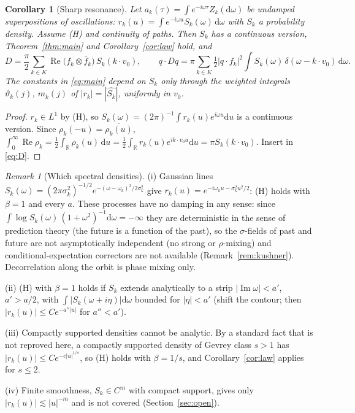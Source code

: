 \documentclass[11pt]{article}
\newcommand{\dd}{\mathrm{d}}
\renewcommand{\Re}{\operatorname{Re}}
\renewcommand{\Im}{\operatorname{Im}}
\newtheorem{corollary}[theorem]{Corollary}
\theoremstyle{remark}
\newtheorem{remark}[theorem]{Remark}
\begin{document}
\begin{corollary}[Sharp resonance]\label{cor:sharp}
Let $a_k(\tau) = \int e^{-i\omega\tau}Z_k(\dd\omega)$ be undamped
superpositions of oscillations: $r_k(u) = \int e^{-i\omega u}S_k(\omega)\,\dd\omega$
with $S_k$ a probability density. Assume \textup{(H)} and continuity of
paths. Then $S_k$ has a continuous version, Theorem~\ref{thm:main} and
Corollary~\ref{cor:law} hold, and
\begin{equation}
  D = \frac\pi2\sum_{k\in K}\Re\bigl(f_k\otimes\bar f_k\bigr)\,S_k(k\cdot v_0),
  \qquad
  q\cdot Dq = \pi\sum_{k\in K}\tfrac12|q\cdot f_k|^2
     \int S_k(\omega)\,\delta(\omega-k\cdot v_0)\,\dd\omega .
  \label{eq:Dsharp}
\end{equation}
The constants in \eqref{eq:main} depend on $S_k$ only through the weighted
integrals $\vartheta_k(j)$, $m_k(j)$ of $|r_k| = |\widehat{S_k}|$, uniformly
in $v_0$.
\end{corollary}

\begin{proof}
$r_k\in L^1$ by (H), so $S_k(\omega) = (2\pi)^{-1}\int r_k(u)e^{i\omega u}\dd u$
is a continuous version. Since $\rho_k(-u) = \overline{\rho_k(u)}$,
$\int_0^\infty\Re\rho_k = \frac12\int_{\mathbb{R}}\rho_k(u)\,\dd u
= \frac12\int_{\mathbb{R}}r_k(u)e^{ik\cdot v_0u}\dd u = \pi S_k(k\cdot v_0)$.
Insert in \eqref{eq:D}.
\end{proof}

\begin{remark}[Which spectral densities]\label{rem:spec}
(i) Gaussian lines $S_k(\omega) = (2\pi\sigma_k^2)^{-1/2}
e^{-(\omega-\omega_k)^2/2\sigma_k^2}$ give
$r_k(u) = e^{-i\omega_ku-\sigma_k^2u^2/2}$: (H) holds with $\beta=1$ and
every $a$. These processes have no damping in any sense: since
$\int\log S_k(\omega)\,(1+\omega^2)^{-1}\dd\omega = -\infty$ they are
deterministic in the sense of prediction theory (the future is a function of
the past), so the $\sigma$-fields of past and future are not asymptotically
independent (no strong or $\rho$-mixing) and conditional-expectation
correctors are not available (Remark~\ref{rem:kushner}). Decorrelation along the orbit
is phase mixing only.

(ii) (H) with $\beta=1$ holds if $S_k$ extends analytically to a strip
$|\Im\omega|<a'$, $a'>a/2$, with $\int|S_k(\omega+i\eta)|\dd\omega$ bounded
for $|\eta|<a'$ (shift the contour; then $|r_k(u)|\le Ce^{-a''|u|}$ for
$a''<a'$).

(iii) Compactly supported densities cannot be analytic. By a standard fact
that is not reproved here, a compactly supported density of Gevrey class
$s>1$ has $|r_k(u)|\le Ce^{-c|u|^{1/s}}$, so (H) holds with $\beta = 1/s$,
and Corollary~\ref{cor:law} applies for $s\le2$.

(iv) Finite smoothness, $S_k\in C^m$ with compact support, gives only
$|r_k(u)|\lesssim|u|^{-m}$ and is not covered (Section~\ref{sec:open}).
\end{remark}
\end{document}
